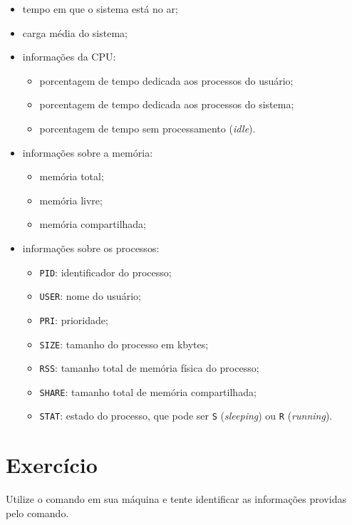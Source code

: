 \begin{itemize}
\setlength{\itemsep}{1pt}\setlength{\parskip}{0pt}  \setlength{\parsep}{0pt}
\item tempo em que o sistema está no ar;
\item carga média do sistema;
\item informações da CPU:
\begin{itemize}
\setlength{\itemsep}{1pt}\setlength{\parskip}{0pt}  \setlength{\parsep}{0pt}
\item porcentagem de tempo dedicada aos processos do usuário;
\item porcentagem de tempo dedicada aos processos do sistema;
\item porcentagem de tempo sem processamento (\textit{idle}).
\end{itemize}
\item informações sobre a memória:
\begin{itemize}
\setlength{\itemsep}{1pt}\setlength{\parskip}{0pt}  \setlength{\parsep}{0pt}
\item memória total;
\item memória  livre;
\item memória  compartilhada;
\end{itemize}
\item informações sobre os processos:
\begin{itemize}
\setlength{\itemsep}{1pt}\setlength{\parskip}{0pt}  \setlength{\parsep}{0pt}
\item \texttt{PID}: identificador do processo;
\item \texttt{USER}: nome do usuário;
\item \texttt{PRI}: prioridade;
\item \texttt{SIZE}: tamanho do processo em kbytes;
\item \texttt{RSS}: tamanho total de memória física do processo;
\item \texttt{SHARE}: tamanho total de memória compartilhada;
\item \texttt{STAT}:  estado do processo, que pode ser \texttt{S}  (\textit{sleeping}) ou \texttt{R} (\textit{running}).
\end{itemize}
\end{itemize}

\section{Exercício}
Utilize o comando  em sua máquina e tente identificar as informações providas pelo comando.

